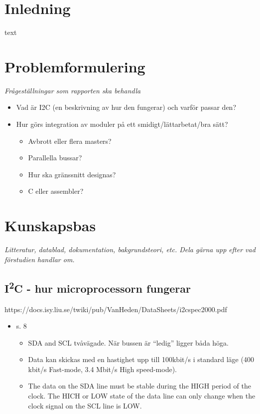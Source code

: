 \documentclass[11pt]{article}
\begin{document}
\begin{flushleft}

\section{Inledning}
text \cite{893287}

\pagebreak

\section{Problemformulering}
\textit{Frågeställningar som rapporten ska behandla}

\begin{itemize}
	\item Vad är I2C (en beskrivning av hur den fungerar) och varför passar den?
	\item Hur görs integration av moduler på ett smidigt/lättarbetat/bra sätt?
	
		\begin{itemize}
			\item Avbrott eller flera masters?
			\item Parallella bussar?
			\item Hur ska gränssnitt designas?
			\item C eller assembler?
		\end{itemize}

\end{itemize}

\pagebreak

\section{Kunskapsbas}
\textit{Litteratur, datablad, dokumentation, bakgrundsteori, etc. Dela gärna upp efter vad förstudien handlar om.}

\subsection{I\textsuperscript{2}C - hur microprocessorn fungerar}
https://docs.isy.liu.se/twiki/pub/VanHeden/DataSheets/i2cspec2000.pdf
	\begin{itemize}
		\item s. 8
		\begin{itemize}
			\item SDA and SCL tvåvägade. När bussen är \textquotedblleft ledig\textquotedblright{} ligger båda höga. 
			\item Data kan skickas med en hastighet upp till 100kbit/s i standard läge (400 kbit/s Fast-mode, 3.4 Mbit/s High speed-mode).
			\item The data on the SDA line must be stable during the HIGH period of the clock. The HICH or LOW state of the data line can only change when the clock signal on the SCL line is LOW.
		\end{itemize}
			

\end{itemize}
\end{flushleft}
\end{document}
